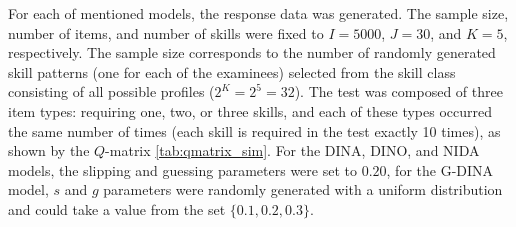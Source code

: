 \documentclass[english]{pwr_wmat_praca_dyplomowa}
\theoremstyle{plain}
\theoremstyle{definition}
\numberwithin{theorem}{chapter}
\begin{document}
For each of mentioned models, the response data was generated. The sample size, number of items, and number of skills were fixed to $I=5000$, $J=30$, and $K=5$, respectively. The sample size corresponds to the number of randomly generated skill patterns (one for each of the examinees) selected from the skill class consisting of all possible profiles ($2^K = 2^5 = 32$). The test was composed of three item types: requiring one, two, or three skills, and each of these types occurred the same number of times (each skill is required in the test exactly 10 times), as shown by the $Q$-matrix \ref{tab:qmatrix_sim}. For the DINA, DINO, and NIDA models, the slipping and guessing parameters were set to $0.20$, for the G-DINA model, $s$ and $g$ parameters were randomly generated with a uniform distribution and could take a value from the set $\{0.1,0.2,0.3\}$. 
\end{document}
